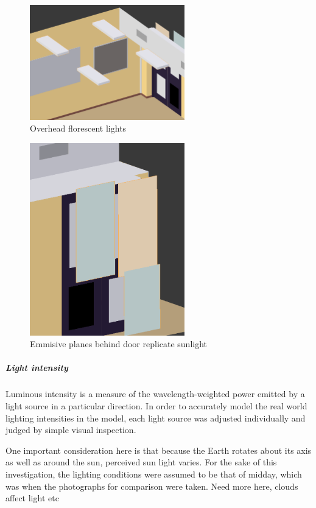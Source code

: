 \documentclass[11pt,a4paper]{report}
\begin{document}
						\begin{figure}[h!]
							\centering
							\includegraphics[width=0.6\textwidth]{overhead_lights}
							\caption{Overhead florescent lights}
						\end{figure}
						\begin{figure}[h!]
							\centering
							\includegraphics[width=0.6\textwidth]{lights_behind_door}
							\caption{Emmisive planes behind door replicate sunlight}
						\end{figure}
					
					\subparagraph{Light intensity}
						Luminous intensity is a measure of the wavelength-weighted power emitted by a light source in a particular direction. In order to accurately model the real world lighting intensities in the model, each light source was adjusted individually and judged by simple visual inspection. 
						
						One important consideration here is that because the Earth rotates about its axis as well as around the sun, perceived sun light varies. For the sake of this investigation, the lighting conditions were assumed to be that of midday, which was when the photographs for comparison were taken. {{Need more here, clouds affect light etc}}
						
\end{document}
